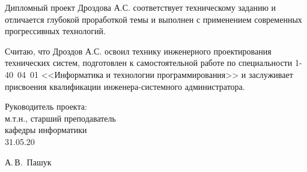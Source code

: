 \begin{singlespace}
{Дипломный проект Дроздова А.С. соответствует техническому заданию и отличается глубокой проработкой темы и выполнен с применением современных прогрессивных технологий.

Считаю, что Дроздов А.С. освоил технику инженерного проектирования технических систем, подготовлен к самостоятельной работе по специальности 1-40~04~01
<<Информатика и технологии программирования>> и заслуживает присвоения квалификации инженера-системного администратора.

  \vfill
  \noindent
  \begin{minipage}{0.54\textwidth}
    \begin{flushleft}
      Руководитель проекта:\\
      м.т.н., старший преподаватель \\
      кафедры информатики\\
      31.05.20
    \end{flushleft}
  \end{minipage}
  \begin{minipage}{0.44\textwidth}
    \begin{flushright}
      \underline{\hspace*{3cm}} А.\,В.~Пашук
    \end{flushright}
  \end{minipage}
}

\end{singlespace}

\clearpage
